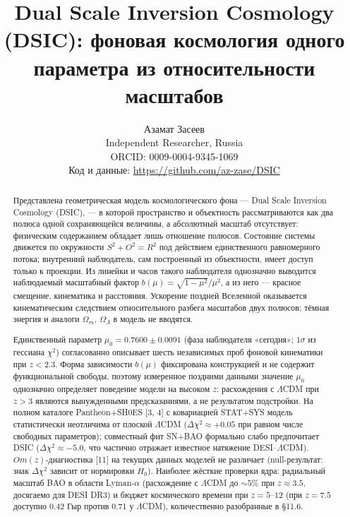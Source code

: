 \documentclass{article}
\begin{document}
\title{Dual Scale Inversion Cosmology (DSIC): фоновая космология одного параметра из относительности масштабов}

\author{Азамат Засеев\\
Independent Researcher, Russia\\
ORCID: 0009-0004-9345-1069\\
Код и данные: \url{https://github.com/az-zase/DSIC}}

\date{}
\maketitle

\begin{abstract}
Представлена геометрическая модель космологического фона --- Dual Scale Inversion Cosmology (DSIC), --- в которой пространство и объектность рассматриваются как два полюса одной сохраняющейся величины, а абсолютный масштаб отсутствует: физическим содержанием обладает лишь отношение полюсов. Состояние системы движется по окружности $S^2 + O^2 = R^2$ под действием единственного равномерного потока; внутренний наблюдатель, сам построенный из объектности, имеет доступ только к проекции. Из линейки и часов такого наблюдателя однозначно выводится наблюдаемый масштабный фактор $b(\mu) = \sqrt{1-\mu^2}/\mu^2$, а из него --- красное смещение, кинематика и расстояния. Ускорение поздней Вселенной оказывается кинематическим следствием относительного разбега масштабов двух полюсов; тёмная энергия и аналоги $\Omega_m$, $\Omega_\Lambda$ в модель не вводятся.

Единственный параметр $\mu_0 = 0.7600 \pm 0.0091$ (фаза наблюдателя «сегодня»; $1\sigma$ из гессиана $\chi^2$) согласованно описывает шесть независимых проб фоновой кинематики при $z < 2.3$. Форма зависимости $b(\mu)$ фиксирована конструкцией и не содержит функциональной свободы, поэтому измеренное поздними данными значение $\mu_0$ однозначно определяет поведение модели на высоком $z$: расхождения с $\Lambda$CDM при $z > 3$ являются вынужденными предсказаниями, а не результатом подстройки. На полном каталоге Pantheon+SH0ES [3, 4] с ковариацией STAT+SYS модель статистически неотличима от плоской $\Lambda$CDM ($\Delta\chi^2 \approx +0.05$ при равном числе свободных параметров); совместный фит SN+BAO формально слабо предпочитает DSIC ($\Delta\chi^2 \approx -5.0$, что частично отражает известное натяжение DESI--$\Lambda$CDM). $Om(z)$-диагностика [11] на текущих данных моделей не различает (null-результат: знак $\Delta\chi^2$ зависит от нормировки $H_0$). Наиболее жёсткие проверки ядра: радиальный масштаб BAO в области Lyman-$\alpha$ (расхождение с $\Lambda$CDM до ${\sim}5\%$ при $z \approx 3.5$, досягаемо для DESI DR3) и бюджет космического времени при $z = 5\text{--}12$ (при $z = 7.5$ доступно 0.42 Гыр против 0.71 у $\Lambda$CDM), количественно разобранные в \S11.6.


\end{abstract}
\end{document}
